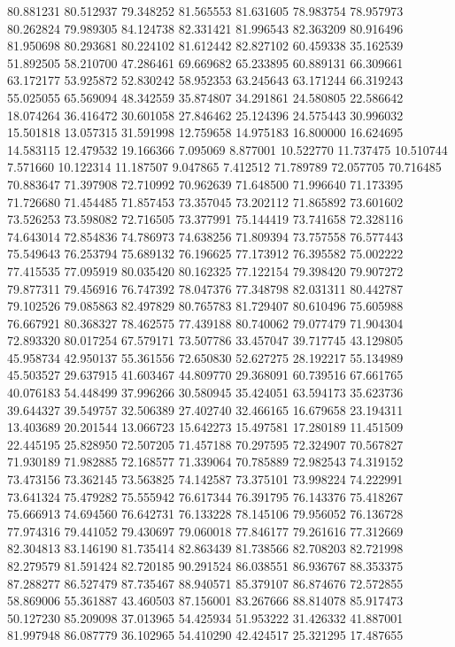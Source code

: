 80.881231
80.512937
79.348252
81.565553
81.631605
78.983754
78.957973
80.262824
79.989305
84.124738
82.331421
81.996543
82.363209
80.916496
81.950698
80.293681
80.224102
81.612442
82.827102
60.459338
35.162539
51.892505
58.210700
47.286461
69.669682
65.233895
60.889131
66.309661
63.172177
53.925872
52.830242
58.952353
63.245643
63.171244
66.319243
55.025055
65.569094
48.342559
35.874807
34.291861
24.580805
22.586642
18.074264
36.416472
30.601058
27.846462
25.124396
24.575443
30.996032
15.501818
13.057315
31.591998
12.759658
14.975183
16.800000
16.624695
14.583115
12.479532
19.166366
7.095069
8.877001
10.522770
11.737475
10.510744
7.571660
10.122314
11.187507
9.047865
7.412512
71.789789
72.057705
70.716485
70.883647
71.397908
72.710992
70.962639
71.648500
71.996640
71.173395
71.726680
71.454485
71.857453
73.357045
73.202112
71.865892
73.601602
73.526253
73.598082
72.716505
73.377991
75.144419
73.741658
72.328116
74.643014
72.854836
74.786973
74.638256
71.809394
73.757558
76.577443
75.549643
76.253794
75.689132
76.196625
77.173912
76.395582
75.002222
77.415535
77.095919
80.035420
80.162325
77.122154
79.398420
79.907272
79.877311
79.456916
76.747392
78.047376
77.348798
82.031311
80.442787
79.102526
79.085863
82.497829
80.765783
81.729407
80.610496
75.605988
76.667921
80.368327
78.462575
77.439188
80.740062
79.077479
71.904304
72.893320
80.017254
67.579171
73.507786
33.457047
39.717745
43.129805
45.958734
42.950137
55.361556
72.650830
52.627275
28.192217
55.134989
45.503527
29.637915
41.603467
44.809770
29.368091
60.739516
67.661765
40.076183
54.448499
37.996266
30.580945
35.424051
63.594173
35.623736
39.644327
39.549757
32.506389
27.402740
32.466165
16.679658
23.194311
13.403689
20.201544
13.066723
15.642273
15.497581
17.280189
11.451509
22.445195
25.828950
72.507205
71.457188
70.297595
72.324907
70.567827
71.930189
71.982885
72.168577
71.339064
70.785889
72.982543
74.319152
73.473156
73.362145
73.563825
74.142587
73.375101
73.998224
74.222991
73.641324
75.479282
75.555942
76.617344
76.391795
76.143376
75.418267
75.666913
74.694560
76.642731
76.133228
78.145106
79.956052
76.136728
77.974316
79.441052
79.430697
79.060018
77.846177
79.261616
77.312669
82.304813
83.146190
81.735414
82.863439
81.738566
82.708203
82.721998
82.279579
81.591424
82.720185
90.291524
86.038551
86.936767
88.353375
87.288277
86.527479
87.735467
88.940571
85.379107
86.874676
72.572855
58.869006
55.361887
43.460503
87.156001
83.267666
88.814078
85.917473
50.127230
85.209098
37.013965
54.425934
51.953222
31.426332
41.887001
81.997948
86.087779
36.102965
54.410290
42.424517
25.321295
17.487655
